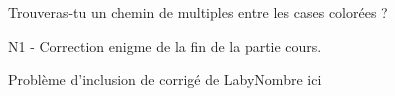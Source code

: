 \numeroteEnigme
\begin{enigme}
    Trouveras-tu un chemin de multiples entre les cases colorées ?

\end{enigme}

\addtocounter{exercice}{-1}
\begin{corrige}
    N1 - Correction enigme de la fin de la partie cours.  

    Problème d'inclusion de corrigé de LabyNombre ici
\end{corrige}